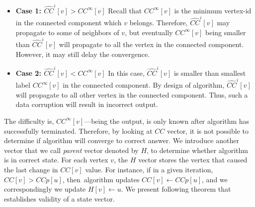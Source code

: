 \begin{itemize}
\item \textbf{Case 1: $\widehat{CC}^{i}[v] > CC^{\infty}[v]$} 
Recall that $CC^{\infty}[v]$ is the minimum vertex-id in the connected component which $v$ belongs.  
Therefore, $\widehat{CC}^{i}[v]$ may propagate to some of neighbors of $v$, but eventually $CC^{\infty}[v]$ being
smaller than $\widehat{CC}^{i}[v]$ will propagate to all the vertex in the connected component. 
However, it may still delay the convergence. 



\item \textbf{Case 2: $\widehat{CC}^{i}[v] < CC^{\infty}[v]$} 
In this case,  $\widehat{CC}^{i}[v]$ is smaller than smallest label $CC^{\infty}[v]$ in the connected component. By design of \sv algorithm, $\widehat{CC}^{i}[v]$
will propagate to all other vertex in the connected component.  Thus, such a data corruption will result in incorrect output. 


\end{itemize}

The difficulty is, $CC^{\infty}[v]$---being the output, is only known after algorithm has successfully terminated. 
Therefore, by looking at $CC$ vector, it is not possible to determine if algorithm will converge to correct answer. 
%
We introduce another vector that we call \emph{parent} vector denoted by $H$, to determine whether algorithm is 
in correct state. 
For each vertex $v$, the $H$ vector stores the vertex that caused the last change in $CC[v]$ value.
For instance, if in a given iteration, $CC[v]>CCp[u]$, then~\sv algorithm updates $CC[v]\leftarrow CCp[u]$, 
and we correspondingly we update $H[v]\leftarrow u$.
We present following theorem that establishes validity of a state vector. 



